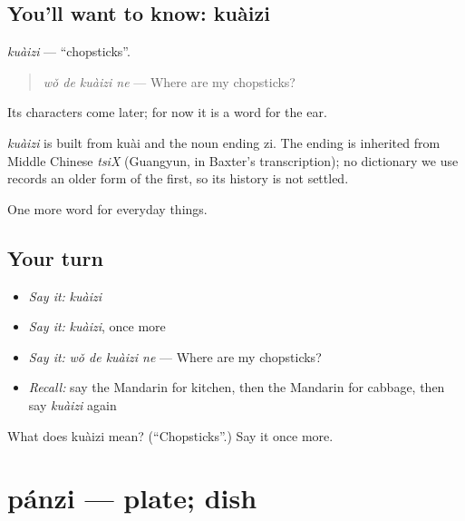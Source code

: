 \subsection*{You'll want to know: kuàizi}
\emph{kuàizi} — \textquotedblleft{}chopsticks\textquotedblright{}.

\begin{quote}
\emph{wǒ de kuàizi ne} — Where are my chopsticks?
\end{quote}

Its characters come later; for now it is a word for the ear.

\begin{cousinweb}
\emph{kuàizi} is built from kuài and the noun ending zi. The ending is inherited from Middle Chinese \emph{tsiX} (Guangyun, in Baxter's transcription); no dictionary we use records an older form of the first, so its history is not settled.
\end{cousinweb}

\begin{grammarlens}[title={What you've built}]
One more word for everyday things.
\end{grammarlens}

\subsection*{Your turn}
\begin{itemize}
\raggedright
  \item \emph{Say it:} \emph{kuàizi}
  \item \emph{Say it:} \emph{kuàizi}, once more
  \item \emph{Say it:} \emph{wǒ de kuàizi ne} — Where are my chopsticks?
  \item \emph{Recall:} say the Mandarin for kitchen, then the Mandarin for cabbage, then say \emph{kuàizi} again
\end{itemize}

\begin{tcolorbox}[breakable,colback=teal!4,colframe=teal!35!black,title={Before you move on}]
What does kuàizi mean? (\textquotedblleft{}Chopsticks\textquotedblright{}.) Say it once more.
\end{tcolorbox}
\section[pánzi]{pánzi — plate; dish}

\label{lesson:ZH-C101-panzi}



